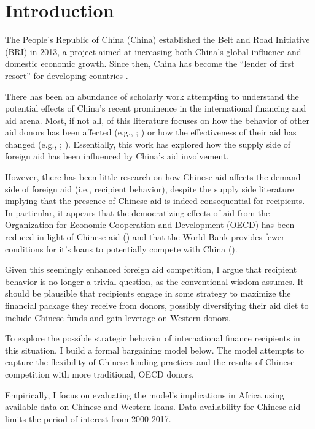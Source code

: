 \section*{Introduction}
The People's Republic of China (China) established the Belt and Road Initiative (BRI) in 2013, a project aimed at increasing both China's global influence and domestic economic growth. Since then, China has become the ``lender of first resort'' for developing countries \parencite[1]{dreher2022}.

There has been an abundance of scholarly work attempting to understand the potential effects of China's recent prominence in the international financing and aid arena. Most, if not all, of this literature focuses on how the behavior of other aid donors has been affected (e.g., \cite{humphrey2019}; \cite{kilama2016a}) or how the effectiveness of their aid has changed (e.g., \cite{blair2022}; \cite{gehring2022}). Essentially, this work has explored how the supply side of foreign aid has been influenced by China's aid involvement. 

However, there has been little research on how Chinese aid affects the demand side of foreign aid (i.e., recipient behavior), despite the supply side literature implying that the presence of Chinese aid is indeed consequential for recipients. In particular, it appears that the democratizing effects of aid from the Organization for Economic Cooperation and Development (OECD) has been reduced in light of Chinese aid (\cite{li2017a}) and that the World Bank provides fewer conditions for it's loans to potentially compete with China (\cite{hernandez2017}).

Given this seemingly enhanced foreign aid competition, I argue that recipient behavior is no longer a trivial question, as the conventional wisdom assumes. It should be plausible that recipients engage in some strategy to maximize the financial package they receive from donors, possibly diversifying their aid diet to include Chinese funds and gain leverage on Western donors. 

To explore the possible strategic behavior of international finance recipients in this situation, I build a formal bargaining model below. The model attempts to capture the flexibility of Chinese lending practices and the results of Chinese competition with more traditional, OECD donors.

Empirically, I focus on evaluating the model's implications in Africa using available data on Chinese and Western loans. Data availability for Chinese aid limits the period of interest from 2000-2017.

